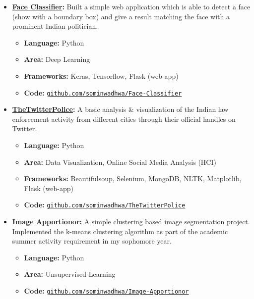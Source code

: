 \documentclass[margin,line]{res}
\begin{document}
\begin{resume}
\begin{itemize}[leftmargin=*]
\begin{itemize}[leftmargin=*]
\end{itemize}
\item {\bf {\href{https://github.com/sominwadhwa/Face-Classifier}{Face Classifier}:}}
Built a simple web application which is able to detect a face (show with a boundary box) and give a result matching the face with a prominent Indian politician.
\begin{itemize}[leftmargin=*]
\item {\bf Language:} Python
\item {\bf Area:} Deep Learning
\item {\bf Frameworks:} Keras, Tensorflow, Flask (web-app)
\item {\bf Code:} {\href{https://github.com/sominwadhwa/Face-Classifier}{\texttt{github.com/sominwadhwa/Face-Classifier}}}
\end{itemize}
\item {\bf {\href{https://github.com/sominwadhwa/TheTwitterPolice}{TheTwitterPolice}:}}
A basic analysis \& visualization of the Indian law enforcement activity from different cities through their official handles on Twitter.
\begin{itemize}[leftmargin=*]
\item {\bf Language:} Python
\item {\bf Area:} Data Visualization, Online Social Media Analysis (HCI)
\item {\bf Frameworks:} Beautifulsoup, Selenium, MongoDB, NLTK, Matplotlib, Flask (web-app)
\item {\bf Code:} {\href{https://github.com/sominwadhwa/TheTwitterPolice}{\texttt{github.com/sominwadhwa/TheTwitterPolice}}}
\end{itemize}
\item {\bf {\href{https://github.com/sominwadhwa/Image-Apportionor}{Image Apportionor}:}}
A simple clustering based image segmentation project. Implemented the k-means clustering algorithm as part of the academic summer activity requirement in my sophomore year.
\begin{itemize}[leftmargin=*]
\item {\bf Language:} Python
\item {\bf Area:} Unsupervised Learning
\item {\bf Code:} {\href{https://github.com/sominwadhwa/Image-Apportionor}{\texttt{github.com/sominwadhwa/Image-Apportionor}}}
\end{itemize}
\end{itemize}

\iffalse
\section{\sc Technical Skills}
{\bf Strongest Areas}: Machine Learning (Classification, Regression, Feature Engineering), Algorithms, Statistical Data Analysis\\
{\bf Languages/Tools/Software}: Python (scikit-learn, Keras, NumPy, Pandas \& others), Java, SQL, MongoDB, \LaTeX, MS Excel
\fi


\end{resume}
\end{document}
